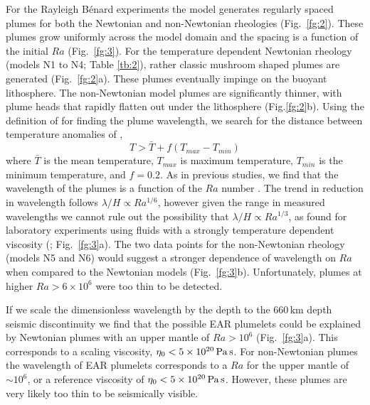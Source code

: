 \documentclass[a4paper,10pt,twocolumn]{paper}
\begin{document}
For the Rayleigh B{\'e}nard experiments the model generates regularly spaced plumes for both the Newtonian and non-Newtonian rheologies (Fig.~\ref{fg:2}). These plumes grow uniformly across the model domain and the spacing is a function of the initial $Ra$ (Fig.~\ref{fg:3}). For the temperature dependent Newtonian rheology (models N1 to N4; Table \ref{tb:2}), rather classic mushroom shaped plumes are generated (Fig.~\ref{fg:2}a). These plumes eventually impinge on the buoyant lithosphere. The non-Newtonian model plumes are significantly thinner, with plume heads that rapidly flatten out under the lithosphere (Fig.\ref{fg:2}b). Using the definition of \cite{labrosse-2002} for finding the plume wavelength, we search for the distance between temperature anomalies of ,
\begin{equation}
T > \bar{T} + f\left(T_{max}- T_{min}\right)
\end{equation}
where $\bar{T}$ is the mean temperature, $T_{max}$ is maximum temperature, $T_{min}$ is the minimum temperature, and $f=0.2$. As in previous studies, we find that the wavelength of the plumes is a function of the $Ra$ number \citep{zhong-2005,galsa-2007,androvandi-etal-2011}. The trend in reduction in wavelength follows $\lambda/H \propto Ra^{1/6}$, however given the range in measured wavelengths we cannot rule out the possibility that $\lambda/H \propto Ra^{1/3}$, as found for laboratory experiments using fluids with a strongly temperature dependent viscosity (\citealp{androvandi-etal-2011}; Fig.~\ref{fg:3}a). The two data points for the non-Newtonian rheology (models N5 and N6) would suggest a stronger dependence of wavelength on $Ra$ when compared to the Newtonian models (Fig.~\ref{fg:3}b). Unfortunately, plumes at higher $Ra > 6\times10^{6}$ were too thin to be detected.

If we scale the dimensionless wavelength by the depth to the 660\,km depth seismic discontinuity we find that the possible EAR plumelets could be explained by Newtonian plumes with an upper mantle of $Ra > 10^6$ (Fig.~\ref{fg:3}a). This corresponds to a scaling viscosity, $\eta_{0} < 5\times10^{20}\rm\,Pa\,s$. For non-Newtonian plumes the wavelength of EAR plumelets corresponds to a $Ra$ for the upper mantle of $\sim 10^6$, or a reference viscosity of $\eta_{0} < 5\times10^{20}\rm\,Pa\,s$. However, these plumes are very likely too thin to be seismically visible.
\end{document}
